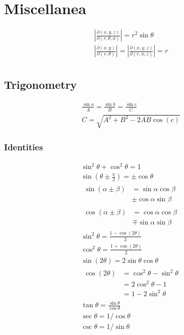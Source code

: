 \documentclass[tbtags]{cheatsheet}
\begin{document}
	\section{Miscellanea}	
		\begin{gather*}
			\left|\frac{\partial(x,y,z)}{\partial(r,\theta,\phi)}\right| = r^2 \sin \theta \\
			\left| \frac{\partial(x,y)}{\partial(r,\theta)} \right| = \left| \frac{\partial(x,y,z)}{\partial(r,\phi,z)} \right| = r\\
		\end{gather*}
	\subsection{Trigonometry}
		\begin{gather*}
			\frac{\sin a}{A} = \frac{\sin b}{B} = \frac{\sin c}{C}	\tag{law of sines}\\
			C = \sqrt{A^2 + B^2 - 2AB\cos(c)}	\tag{law of cosines}
		\end{gather*}

		\subsubsection{Identities}
			\begin{gather*}
				\sin^2\theta + \cos^2\theta = 1\\
				\sin(\theta \pm \frac{\pi}{2}) = \pm\cos\theta\\
				\begin{split}
					\sin(\alpha \pm \beta) &= \sin\alpha\cos\beta\\
					 &\pm \cos\alpha\sin\beta
				\end{split}\\
				\begin{split}
					\cos(\alpha \pm \beta) &= \cos\alpha\cos\beta \\
					&\mp \sin\alpha\sin\beta
				\end{split}\\
				\sin^2 \theta = \frac{1-\cos(2\theta)}{2}\\
				\cos^2 \theta = \frac{1+\cos(2\theta)}{2}\\
				\sin(2\theta) = 2\sin\theta\cos\theta\\
				\begin{split}
					\cos(2\theta) &= \cos^2\theta - \sin^2\theta\\
					&= 2\cos^2\theta - 1\\
					&= 1 - 2\sin^2\theta
				\end{split}\\
				\tan\theta = \frac{\sin\theta}{\cos\theta}\\
				\sec\theta = 1/\cos\theta\\
				\csc\theta = 1/\sin\theta
			\end{gather*}
\end{document}
